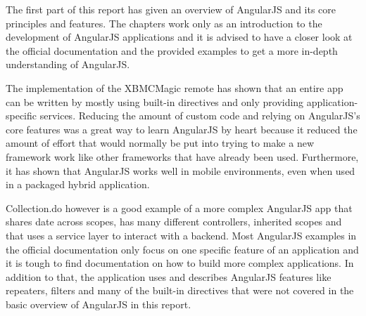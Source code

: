The first part of this report has given an overview of AngularJS and its core principles and features. The chapters work only as an introduction to the development of AngularJS applications and it is advised to have a closer look at the official documentation and the provided examples to get a more in-depth understanding of AngularJS.

The implementation of the XBMCMagic remote has shown that an entire app can be written by mostly using built-in directives and only providing application-specific services. Reducing the amount of custom code and relying on AngularJS's core features was a great way to learn AngularJS by heart because it reduced the amount of effort that would normally be put into trying to make a new framework work like other frameworks that have already been used. Furthermore, it has shown that AngularJS works well in mobile environments, even when used in a packaged hybrid application.

Collection.do however is a good example of a more complex AngularJS app that shares date across scopes, has many different controllers, inherited scopes and that uses a service layer to interact with a backend. Most AngularJS examples in the official documentation only focus on one specific feature of an application and it is tough to find documentation on how to build more complex applications. In addition to that, the application uses and describes AngularJS features like repeaters, filters and many of the built-in directives that were not covered in the basic overview of AngularJS in this report.